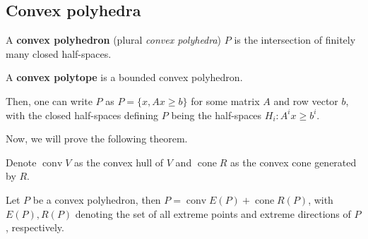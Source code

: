 

\subsection{Convex polyhedra} %
\label{sub:Convex polyhedra}

\begin{definition}
  A \textbf{convex polyhedron} (plural \textit{convex polyhedra}) \( P \) is
  the intersection of finitely many closed half-spaces.

  A \textbf{convex polytope} is a bounded convex polyhedron.
\end{definition}

Then, one can write \( P \) as \( P = \{x, Ax \ge  b\}   \) for some matrix \( A
\) and row vector \( b \), with the closed half-spaces defining \( P \) being
the half-spaces \( H_{i}: A^{i}x \ge  b^{i} \).

Now, we will prove the following theorem.

\begin{theorem}
\label{thr:Minkowski's Theorem for Polyhedra}
  Denote \( \operatorname{conv} V \) as the convex hull of \( V \) and \(
  \operatorname{cone} R \) as the convex cone generated by \( R \).

  Let \( P \) be a convex polyhedron, then \( P = \operatorname{conv} E(P) +
  \operatorname{cone} R(P)\), with \( E(P), R(P) \) denoting the set of all
  extreme points and extreme directions of \( P \), respectively.
\end{theorem}

